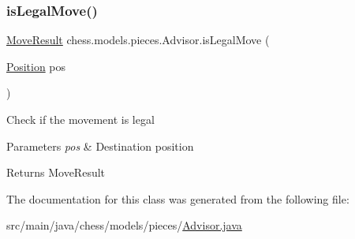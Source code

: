 \mbox{\label{classchess_1_1models_1_1pieces_1_1_advisor_afd4015213fb9b97240f4235a9776f972}} 
\subsubsection{\texorpdfstring{is\+Legal\+Move()}{isLegalMove()}}
{\footnotesize\ttfamily \mbox{\hyperlink{enumchess_1_1models_1_1enums_1_1_move_result}{Move\+Result}} chess.\+models.\+pieces.\+Advisor.\+is\+Legal\+Move (\begin{DoxyParamCaption}\item[{\mbox{\hyperlink{classchess_1_1models_1_1_position}{Position}}}]{pos }\end{DoxyParamCaption})}

Check if the movement is legal


\begin{DoxyParams}{Parameters}
{\em pos} & Destination position \\
\hline
\end{DoxyParams}
\begin{DoxyReturn}{Returns}
Move\+Result 
\end{DoxyReturn}


The documentation for this class was generated from the following file\+:\begin{DoxyCompactItemize}
\item 
src/main/java/chess/models/pieces/\mbox{\hyperlink{_advisor_8java}{Advisor.\+java}}\end{DoxyCompactItemize}
